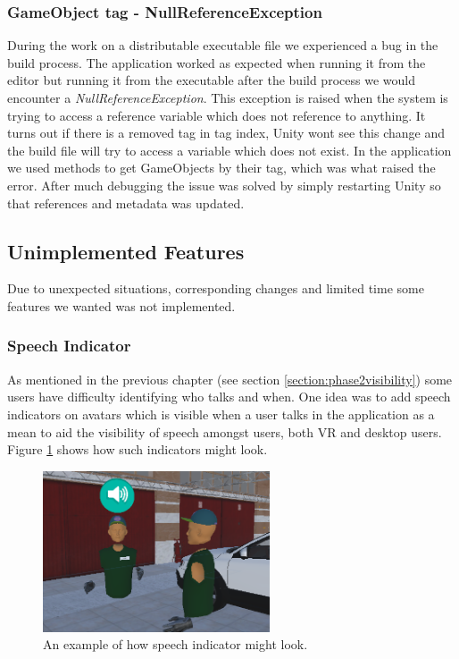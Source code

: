 \subsubsection{GameObject tag - NullReferenceException}
During the work on a distributable executable file we experienced a bug in the build process. The application worked as expected when running it from the editor but running it from the executable after the build process we would encounter a \textit{NullReferenceException}. This exception is raised when the system is trying to access a reference variable which does not reference to anything. It turns out if there is a removed tag in tag index, Unity wont see this change and the build file will try to access a variable which does not exist. In the application we used methods to get GameObjects by their tag, which was what raised the error. After much debugging the issue was solved by simply restarting Unity so that references and metadata was updated.  


\subsection{Unimplemented Features}
Due to unexpected situations, corresponding changes and limited time some features we wanted was not implemented. 

\subsubsection{Speech Indicator}
As mentioned in the previous chapter (see section \ref{section:phase2visibility}) some users have difficulty identifying who talks and when. One idea was to add speech indicators on avatars which is visible when a user talks in the application as a mean to aid the visibility of speech amongst users, both VR and desktop users. Figure \ref{fig:phase3_speech} shows how such indicators might look.


\begin{figure}[H]
  \centering
   \captionsetup{width=.6\linewidth}
    \includegraphics[width=0.6\textwidth]{fig/phase_3/implementation/speechIndicator.PNG}
 \caption{An example of how speech indicator might look.}
\label{fig:phase3_speech}
\end{figure}


